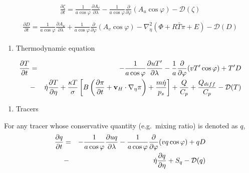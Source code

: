 \begin{eqnarray}\begin{aligned}
  \frac{\partial \zeta}{\partial t} 
     =   \frac{1}{a\cos\varphi}
            \frac{\partial A_v}{\partial \lambda}
          - \frac{1}{a\cos \varphi}
            \frac{\partial}{\partial \varphi} ( A_u \cos\varphi )
          - {\mathcal D}(\zeta) \end{aligned}\end{eqnarray} \begin{eqnarray}\begin{aligned}
  \frac{\partial D}{\partial t} 
     =    \frac{1}{a\cos\varphi}
            \frac{\partial A_u}{\partial \lambda}
          + \frac{1}{a\cos\varphi}
            \frac{\partial }{\partial \varphi} ( A_v \cos\varphi )
          - \nabla^{2}_{\eta}
           ( \Phi + R \bar{T} \pi + E ) 
          - {\mathcal D}(D) \end{aligned}\end{eqnarray}

\begin{enumerate}
\def\labelenumi{\arabic{enumi}.}
\tightlist
\item
  Thermodynamic equation
\end{enumerate}

\begin{eqnarray}\begin{aligned}
  \frac{\partial T}{\partial t}
     &=&  - \frac{1}{a\cos\varphi}
               \frac{\partial uT'}{\partial \lambda}
          - \frac{1}{a}
               \frac{\partial }{\partial \varphi} ( vT' \cos\varphi )
          + T' D \notag \\
        &-& \dot{\eta} 
              \frac{\partial T }{\partial \eta}
          + \frac{\kappa T}{\sigma} \left[ B\left( \frac{\partial \pi}{\partial t}
                            + {\mathbf{v}}_{H} \cdot \nabla_{\eta}\pi \right)
                            + \frac{ m\dot{\eta} }{ p_s }
                     \right]
          + \frac{Q}{C_{p}}
          + \frac{Q_{diff}}{C_{p}}
          - {\mathcal D}(T) \end{aligned}\end{eqnarray}

\begin{enumerate}
\def\labelenumi{\arabic{enumi}.}
\tightlist
\item
  Tracers
\end{enumerate}

For any tracer whose conservative quantity (e.g.~mixing ratio) is denoted as \(q\), \begin{eqnarray}\begin{aligned}
  \frac{\partial q}{\partial t}
   &=&  - \frac{1}{a\cos\varphi}
               \frac{\partial uq}{\partial \lambda}
          - \frac{1}{a\cos\varphi}
               \frac{\partial }{\partial \varphi} (vq \cos\varphi)
          + q D \notag \\
        &-& \dot{\eta} \frac{\partial q }{\partial \eta}
          + S_{q}
          - {\mathcal D}(q) \end{aligned}\end{eqnarray}

